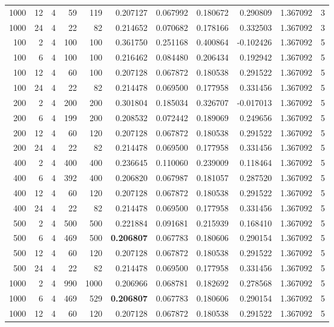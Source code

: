 \begin{table}
\begin{tabular}{rrrrrrrrrrr}
1000 & 12 & 4 & 59 & 119 & 0.207127 & 0.067992 & 0.180672 & 0.290809 & 1.367092 & 3 \\
1000 & 24 & 4 & 22 & 82 & 0.214652 & 0.070682 & 0.178166 & 0.332503 & 1.367092 & 3 \\
100 & 2 & 4 & 100 & 100 & 0.361750 & 0.251168 & 0.400864 & -0.102426 & 1.367092 & 5 \\
100 & 6 & 4 & 100 & 100 & 0.216462 & 0.084480 & 0.206434 & 0.192942 & 1.367092 & 5 \\
100 & 12 & 4 & 60 & 100 & 0.207128 & 0.067872 & 0.180538 & 0.291522 & 1.367092 & 5 \\
100 & 24 & 4 & 22 & 82 & 0.214478 & 0.069500 & 0.177958 & 0.331456 & 1.367092 & 5 \\
200 & 2 & 4 & 200 & 200 & 0.301804 & 0.185034 & 0.326707 & -0.017013 & 1.367092 & 5 \\
200 & 6 & 4 & 199 & 200 & 0.208532 & 0.072442 & 0.189069 & 0.249656 & 1.367092 & 5 \\
200 & 12 & 4 & 60 & 120 & 0.207128 & 0.067872 & 0.180538 & 0.291522 & 1.367092 & 5 \\
200 & 24 & 4 & 22 & 82 & 0.214478 & 0.069500 & 0.177958 & 0.331456 & 1.367092 & 5 \\
400 & 2 & 4 & 400 & 400 & 0.236645 & 0.110060 & 0.239009 & 0.118464 & 1.367092 & 5 \\
400 & 6 & 4 & 392 & 400 & 0.206820 & 0.067987 & 0.181057 & 0.287520 & 1.367092 & 5 \\
400 & 12 & 4 & 60 & 120 & 0.207128 & 0.067872 & 0.180538 & 0.291522 & 1.367092 & 5 \\
400 & 24 & 4 & 22 & 82 & 0.214478 & 0.069500 & 0.177958 & 0.331456 & 1.367092 & 5 \\
500 & 2 & 4 & 500 & 500 & 0.221884 & 0.091681 & 0.215939 & 0.168410 & 1.367092 & 5 \\
500 & 6 & 4 & 469 & 500 & \textbf{0.206807} & 0.067783 & 0.180606 & 0.290154 & 1.367092 & 5 \\
500 & 12 & 4 & 60 & 120 & 0.207128 & 0.067872 & 0.180538 & 0.291522 & 1.367092 & 5 \\
500 & 24 & 4 & 22 & 82 & 0.214478 & 0.069500 & 0.177958 & 0.331456 & 1.367092 & 5 \\
1000 & 2 & 4 & 990 & 1000 & 0.206966 & 0.068781 & 0.182692 & 0.278568 & 1.367092 & 5 \\
1000 & 6 & 4 & 469 & 529 & \textbf{0.206807} & 0.067783 & 0.180606 & 0.290154 & 1.367092 & 5 \\
1000 & 12 & 4 & 60 & 120 & 0.207128 & 0.067872 & 0.180538 & 0.291522 & 1.367092 & 5 \\

\end{tabular}
\end{table}
